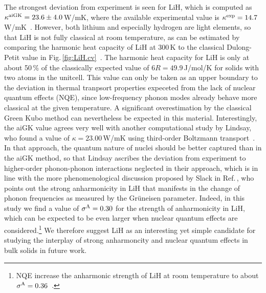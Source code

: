The strongest deviation from experiment is seen for LiH, which is computed as $\kappa^{\rm aiGK} = 23.6 \pm 4.0$\,W/mK, where the available experimental value is $\kappa^{\rm exp} = 14.7$\,W/mK~\cite{slack1973}. However, both lithium and especially hydrogen are light elements, so that LiH is not fully classical at room temperature, as can be estimated by comparing the harmonic heat capacity of LiH at 300\,K to the classical Dulong-Petit value in Fig.\,\ref{fig:LiH.cv}~\cite{Dove}. The harmonic heat capacity for LiH is only at about 50\,\% of the classically expected value of $6 R = 49.9$\,J/mol/K for solids with two atoms in the unitcell. This value can only be taken as an upper boundary to the deviation in thermal tranpsort properties expeceted from the lack of nuclear quantum effects (NQE), since low-frequency phonon modes already behave more classical at the given temperature.  A significant overestimation by the classical Green Kubo method can nevertheless be expected in this material. Interestingly, the aiGK value agrees very well with another computational study by Lindsay, who found a value of $\kappa = 23.00$\,W/mK using third-order Boltzmann transport~\cite{lindsay2016}. In that approach, the quantum nature of nuclei should be better captured than in the aiGK method, so that Lindsay ascribes the deviation from experiment to higher-order phonon-phonon interactions neglected in their approach, which is in line with the more phenomenological discussion proposed by Slack in Ref.\,\cite{slack1973}, who points out the strong anharmonicity in LiH that manifests in the change of phonon frequencies as measured by the Gr\"uneisen parameter. Indeed, in this study we find a value of $\sigma^\mathrm{A} = 0.30$ for the strength of anharmonicity in LiH, which can be expected to be even larger when nuclear quantum effects are considered.\footnote{NQE increase the anharmonic strength of LiH at room temperature to about $\sigma^\mathrm{A} = 0.36$~\cite{hengst1}.} We therefore suggest LiH as an interesting yet simple candidate for studying the interplay of strong anharmoncity and nuclear quantum effects in bulk solids in future work.


